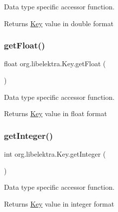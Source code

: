 Data type specific accessor function. 

\begin{DoxyReturn}{Returns}
\mbox{\hyperlink{classorg_1_1libelektra_1_1Key}{Key}} value in double format 
\end{DoxyReturn}
\mbox{\label{classorg_1_1libelektra_1_1Key_a24351f3c1faf4f7d69c7761aa60e69f1}} 
\subsubsection{\texorpdfstring{getFloat()}{getFloat()}}
{\footnotesize\ttfamily float org.\+libelektra.\+Key.\+get\+Float (\begin{DoxyParamCaption}{ }\end{DoxyParamCaption})\hspace{0.3cm}{\ttfamily [inline]}}



Data type specific accessor function. 

\begin{DoxyReturn}{Returns}
\mbox{\hyperlink{classorg_1_1libelektra_1_1Key}{Key}} value in float format 
\end{DoxyReturn}
\mbox{\label{classorg_1_1libelektra_1_1Key_a1dfefbb75e54fd1bff57d626954fb4fc}} 
\subsubsection{\texorpdfstring{getInteger()}{getInteger()}}
{\footnotesize\ttfamily int org.\+libelektra.\+Key.\+get\+Integer (\begin{DoxyParamCaption}{ }\end{DoxyParamCaption})\hspace{0.3cm}{\ttfamily [inline]}}



Data type specific accessor function. 

\begin{DoxyReturn}{Returns}
\mbox{\hyperlink{classorg_1_1libelektra_1_1Key}{Key}} value in integer format 
\end{DoxyReturn}
\mbox{\label{classorg_1_1libelektra_1_1Key_a545c7042ebb95d4b8ad45658ebb8ec85}} 
